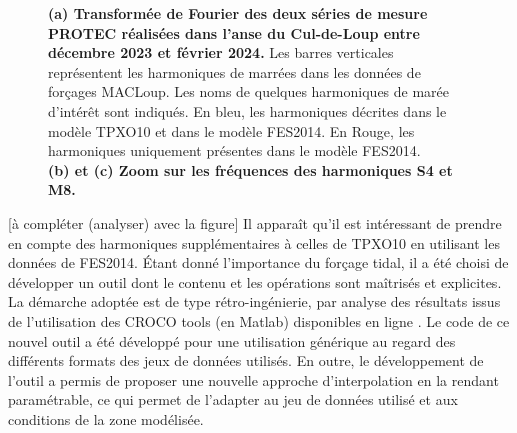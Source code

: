 \documentclass[10pt,a4paper,titlepage]{article}
\begin{document}
\begin{figure}[H]
\begin{subfigure}{0.45\linewidth}
        \caption{}
    \end{subfigure}
    \caption{
        \textbf{(a) Transformée de Fourier des deux séries de mesure PROTEC réalisées dans l'anse du Cul-de-Loup entre décembre 2023 et février 2024.}
        Les barres verticales représentent les harmoniques de marrées dans les données de forçages MACLoup.
        Les noms de quelques harmoniques de marée d'intérêt sont indiqués.
        En bleu, les harmoniques décrites dans le modèle TPXO10 et dans le modèle FES2014.
        En Rouge, les harmoniques uniquement présentes dans le modèle FES2014.
        \\
        \textbf{(b) et (c) Zoom sur les fréquences des harmoniques S4 et M8.}
    }
    \label{fig:ana_signaux_protec}
\end{figure}

\alert{[à compléter (analyser) avec la figure]}
Il apparaît qu'il est intéressant de prendre en compte des harmoniques supplémentaires à celles de TPXO10 en utilisant les données de FES2014.
Étant donné l'importance du forçage tidal, il a été choisi de développer un outil dont le contenu et les opérations sont maîtrisés et explicites.
La démarche adoptée est de type rétro-ingénierie, par analyse des résultats issus de l'utilisation des CROCO tools (en Matlab) disponibles en ligne \parencite{croco_files_examples}.
Le code de ce nouvel outil a été développé pour une utilisation générique au regard des différents formats des jeux de données utilisés.
En outre, le développement de l'outil a permis de proposer une nouvelle approche d'interpolation en la rendant paramétrable, ce qui permet de l'adapter au jeu de données utilisé et aux conditions de la zone modélisée.
\end{document}
